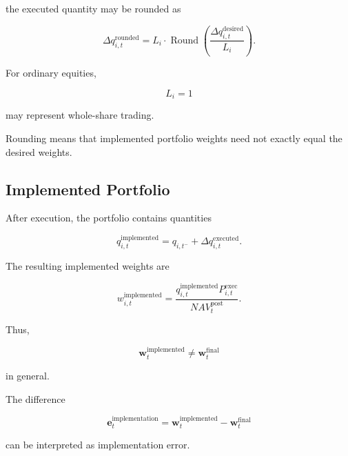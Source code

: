 \documentclass[11pt,a4paper]{article}
\begin{document}
the executed quantity may be rounded as

\begin{equation}
\boxed{
\Delta q_{i,t}^{\mathrm{rounded}}
=
L_i
\cdot
\operatorname{Round}
\left(
\frac{
\Delta q_{i,t}^{\mathrm{desired}}
}{
L_i
}
\right).
}
\end{equation}

For ordinary equities,

\begin{equation}
L_i=1
\end{equation}

may represent whole-share trading.

Rounding means that implemented portfolio weights need not exactly equal the
desired weights.


\subsection{Implemented Portfolio}

After execution, the portfolio contains quantities

\begin{equation}
\boxed{
q_{i,t}^{\mathrm{implemented}}
=
q_{i,t^-}
+
\Delta q_{i,t}^{\mathrm{executed}}.
}
\end{equation}

The resulting implemented weights are

\begin{equation}
\boxed{
w_{i,t}^{\mathrm{implemented}}
=
\frac{
q_{i,t}^{\mathrm{implemented}}
P_{i,t}^{\mathrm{exec}}
}{
NAV_t^{\mathrm{post}}
}.
}
\end{equation}

Thus,

\begin{equation}
\boxed{
\mathbf{w}_t^{\mathrm{implemented}}
\neq
\mathbf{w}_t^{\mathrm{final}}
}
\end{equation}

in general.

The difference

\begin{equation}
\boxed{
\mathbf{e}_t^{\mathrm{implementation}}
=
\mathbf{w}_t^{\mathrm{implemented}}
-
\mathbf{w}_t^{\mathrm{final}}
}
\end{equation}

can be interpreted as implementation error.
\end{document}
